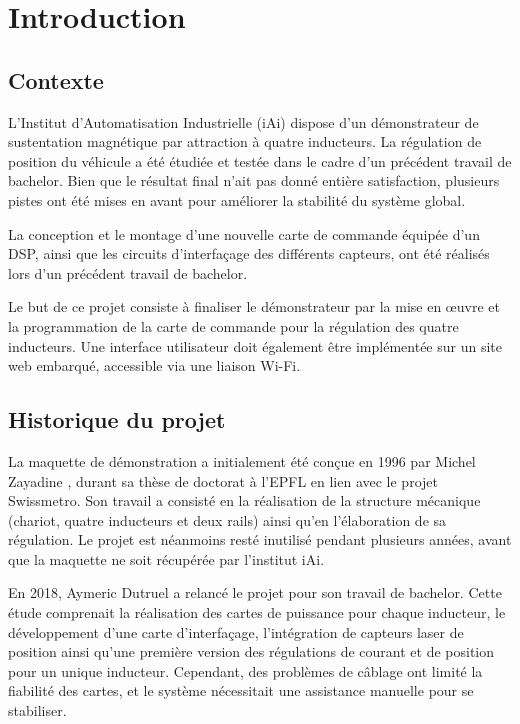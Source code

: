 \chapter{Introduction}

\section{Contexte}
L'Institut d'Automatisation Industrielle (iAi) dispose d'un démonstrateur de sustentation magnétique par attraction à quatre inducteurs. La régulation de position du véhicule a été étudiée et testée dans le cadre d'un précédent travail de bachelor. Bien que le résultat final n'ait pas donné entière satisfaction, plusieurs pistes ont été mises en avant pour améliorer la stabilité du système global.

La conception et le montage d'une nouvelle carte de commande équipée d'un DSP, ainsi que les circuits d'interfaçage des différents capteurs, ont été réalisés lors d'un précédent travail de bachelor.

Le but de ce projet consiste à finaliser le démonstrateur par la mise en œuvre et la programmation de la carte de commande pour la régulation des quatre inducteurs. Une interface utilisateur doit également être implémentée sur un site web embarqué, accessible via une liaison Wi-Fi.

\section{Historique du projet}

La maquette de démonstration a initialement été conçue en 1996 par Michel Zayadine \cite{Zayadine}, durant sa thèse de doctorat à l'EPFL en lien avec le projet Swissmetro. Son travail a consisté en la réalisation de la structure mécanique (chariot, quatre inducteurs et deux rails) ainsi qu'en l'élaboration de sa régulation. Le projet est néanmoins resté inutilisé pendant plusieurs années, avant que la maquette ne soit récupérée par l'institut iAi.

En 2018, Aymeric Dutruel \cite{Aymeric} a relancé le projet pour son travail de bachelor. Cette étude comprenait la réalisation des cartes de puissance pour chaque inducteur, le développement d'une carte d'interfaçage, l'intégration de capteurs laser de position ainsi qu'une première version des régulations de courant et de position pour un unique inducteur. Cependant, des problèmes de câblage ont limité la fiabilité des cartes, et le système nécessitait une assistance manuelle pour se stabiliser.

